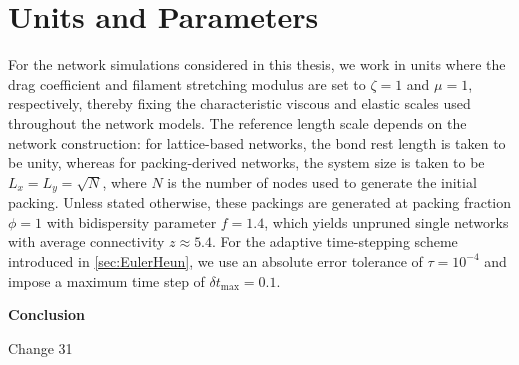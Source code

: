 \documentclass[asymmetricmargins]{library/duthesis}%
\newcommand{\DiffReportBodyFont}{\small}
\newcommand{\DiffReportLocationFont}{\large\bfseries}
\newcommand{\DiffReportMetaFont}{\small\ttfamily}
\newcommand{\DiffReportLocation}[1]{%
  \Needspace{4\baselineskip}%
  \par\medskip
  {\DiffReportLocationFont #1\par}
}
\newcommand{\DiffReportChange}[1]{%
  \Needspace{4\baselineskip}%
  \par\smallskip
  {\DiffReportMetaFont Change #1\par}
  \smallskip
}
\newenvironment{DiffReportContent}
  {\begingroup\DiffReportBodyFont}
  {\par\endgroup\medskip}
\begin{document}
\begin{DiffReportContent}
\section{Units and Parameters}
For the network simulations considered in this thesis, we work in units where the drag coefficient and filament stretching modulus are set to $\zeta = 1$ and $\mu = 1$, respectively, thereby fixing the characteristic viscous and elastic scales used throughout the network models. The reference length scale depends on the network construction: for lattice-based networks, the bond rest length is taken to be unity, whereas for packing-derived networks, the system size is taken to be $L_x = L_y = \sqrt{N}$, where $N$ is the number of nodes used to generate the initial packing. Unless stated otherwise, these packings are generated at packing fraction $\phi = 1$ with bidispersity parameter $f = 1.4$, which yields unpruned single networks with average connectivity $z \approx 5.4$. For the adaptive time-stepping scheme introduced in \cref{sec:EulerHeun}, we use an absolute error tolerance of $\tau = 10^{-4}$ and impose a maximum time step of $\delta t_{\max} = 0.1$.
\end{DiffReportContent}
\DiffReportLocation{Conclusion}
\DiffReportChange{31}
\end{document}

